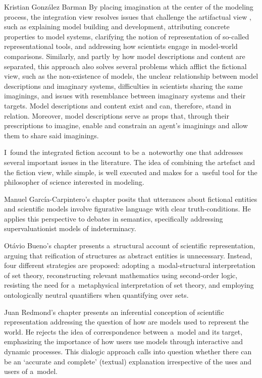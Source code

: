 \begin{recengenv}{Kristian González Barman}
By placing imagination at the center of the modeling process, the integration view resolves issues that challenge the artifactual view
\parencite*[][p.173]{cassini_models_2021}, %
 such as explaining model building and development, attributing concrete properties to model systems, clarifying the notion of representation of so-called representational tools, and addressing how scientists engage in model-world comparisons. Similarly, and partly by how model descriptions and content are separated, this approach also solves several problems which afflict the fictional view, such as the non-existence of models, the unclear relationship between model descriptions and imaginary systems, difficulties in scientists sharing the same imaginings, and issues with resemblance between imaginary systems and their targets. Model descriptions and content exist and can, therefore, stand in relation. Moreover, model descriptions serve as props that, through their prescriptions to imagine, enable and constrain an agent's imaginings and allow them to share said imaginings.

I~found the integrated fiction account to be a~noteworthy one that addresses several important issues in the literature. The idea of combining the artefact and the fiction view, while simple, is well executed and makes for a~useful tool for the philosopher of science interested in modeling.

Manuel García-Carpintero's chapter posits that utterances about fictional entities and scientific models involve figurative language with clear truth-conditions. He applies this perspective to debates in semantics, specifically addressing supervaluationist models of indeterminacy.

Otávio Bueno's chapter presents a~structural account of scientific representation, arguing that reification of structures as abstract entities is unnecessary. Instead, four different strategies are proposed: adopting a~modal-structural interpretation of set theory, reconstructing relevant mathematics using second-order logic, resisting the need for a~metaphysical interpretation of set theory, and employing ontologically neutral quantifiers when quantifying over sets.

Juan Redmond's chapter presents an inferential conception of scientific representation addressing the question of how are models used to represent the world. He rejects the idea of correspondence between a~model and its target, emphasizing the importance of how users use models through interactive and dynamic processes. This dialogic approach calls into question whether there can be an ‘accurate and complete' (textual) explanation irrespective of the uses and users of a~model.


\end{recengenv}

